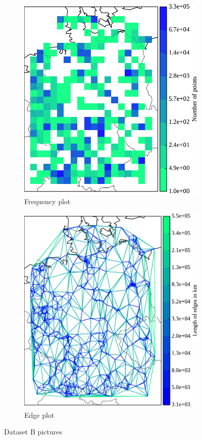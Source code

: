 %
\begin{figure}[p]
	\begin{subfigure}[b]{.49\textwidth}
	\centering
	\includegraphics[width=.99\textwidth]{pix/freq_ger.pdf}
		\caption{Frequency plot}
	\end{subfigure}
	\begin{subfigure}[b]{.482\textwidth}
	\centering
	\includegraphics[width=.99\textwidth]{pix/tri_ger.pdf}
		\caption{Edge plot}
	\end{subfigure}
	\caption[Dataset B frequency and edge plots]{Dataset B pictures}
	\label{fig:B}
\end{figure}
